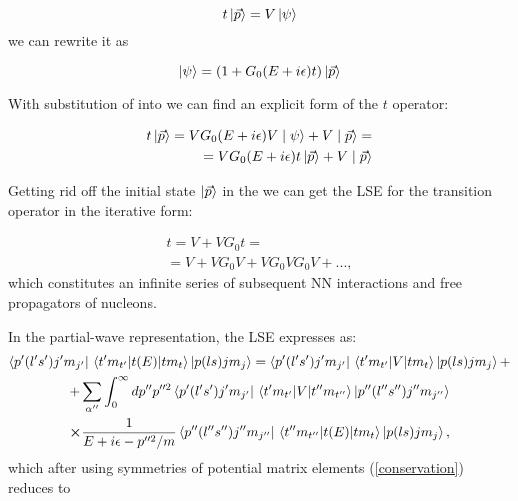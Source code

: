     \begin{equation}
        t \ket{\vec{p}} = V \ket{\psi}
        \label{t-op}
    \end{equation}
    we can rewrite it as 

    \begin{equation}
        \ket{\psi} = (1 + G_0(E + i\epsilon) t)  \ket {\vec{p}}
        \label{psi_toper}
    \end{equation}

    With substitution of  into  we can find
    an explicit form of the $t$ operator:

    \begin{eqnarray}
        t \ket{\vec{p}} = V G_0(E + i\epsilon)V \mid \psi \rangle +  V \mid \vec{p} \rangle = \nonumber\\
        = V G_0(E + i\epsilon) t \ket{\vec{p}} +  V \mid \vec{p} \rangle
        \label{top2}
    \end{eqnarray}

    Getting rid off the initial state $\ket{\vec{p}}$ in the  we can get the LSE
    for the transition operator in the iterative form:

    \begin{eqnarray}
        t = V + V G_0 t = \nonumber\\
        = V + V G_0 V + V G_0 V G_0V + ...,
        \label{lse_gen}
    \end{eqnarray}
    which constitutes an infinite series of subsequent NN interactions and free propagators of nucleons.

    In the partial-wave representation, the LSE  expresses as:
    \begin{multline}
        \bra{p^\prime (l^\prime s^\prime)j'm_{j'}}\matrixel{t' m_{t'}}{t(E)}{t m_t}\ket{p (l s)jm_{j}} = 
        \bra{p^\prime (l^\prime s^\prime)j'm_{j'}}\matrixel{t' m_{t'}}{V}{t m_t}\ket{p (l s)jm_{j}} + \\
        +\sum_{\alpha^{\prime\prime}} \int_0^\infty dp^{\prime \prime} p^{\prime \prime 2}
        \bra{p^\prime (l^\prime s^\prime)j'm_{j'}}\matrixel{t' m_{t'}}{V}
        {t'' m_{t''}}\ket{p'' (l'' s'')j''m_{j''}} \\
        \cross \frac{1}{E + i\epsilon - p^{\prime \prime 2}/m}
        \bra{p'' (l'' s'')j''m_{j''}}\matrixel{t'' m_{t''}}{t(E)}{t m_t}\ket{p (l s)jm_{j}},
        \label{lse_pwd}
    \end{multline}
    which after using symmetries of potential matrix elements (\ref{conservation}) reduces to
    
